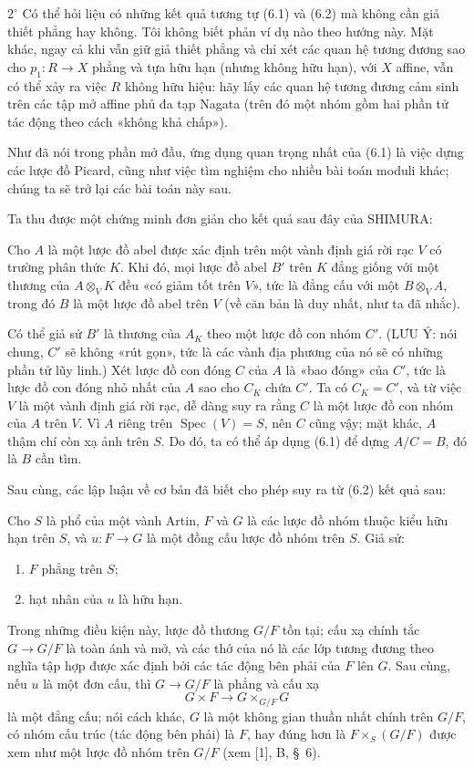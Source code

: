 \smallskip
\noindent $2^\circ$ Có thể hỏi liệu có những kết quả tương tự (6.1) và (6.2)
mà không cần giả thiết phẳng hay không. Tôi không biết phản ví dụ nào theo
hướng này. Mặt khác, ngay cả khi vẫn giữ giả thiết phẳng và chỉ xét các quan
hệ tương đương sao cho $p_1:R\to X$ phẳng và tựa hữu hạn (nhưng không hữu
hạn), với $X$ affine, vẫn có thể xảy ra việc $R$ không hữu hiệu: hãy lấy các
quan hệ tương đương cảm sinh trên các tập mở affine phủ đa tạp Nagata (trên đó
một nhóm gồm hai phần tử tác động theo cách «không khả chấp»).


Như đã nói trong phần mở đầu, ứng dụng quan trọng nhất của (6.1) là việc dựng
các lược đồ Picard, cũng như việc tìm nghiệm cho nhiều bài toán moduli khác;
chúng ta sẽ trở lại các bài toán này sau.

Ta thu được một chứng minh đơn giản cho kết quả sau đây của SHIMURA:

 Cho $A$ là một lược đồ abel được xác định trên một vành
định giá rời rạc $V$ có trường phân thức $K$. Khi đó, mọi lược đồ abel $B'$
trên $K$ đẳng giống với một thương của $A\otimes_V K$ đều «có giảm tốt trên
$V$», tức là đẳng cấu với một $B\otimes_V A$, trong đó $B$ là
một lược đồ abel trên $V$ (về căn bản là duy nhất, như ta đã nhắc).

Có thể giả sử $B'$ là thương của $A_K$ theo một lược đồ con nhóm $C'$.
(LƯU Ý: nói chung, $C'$ sẽ không «rút gọn», tức là các vành địa phương của nó
sẽ có những phần tử lũy linh.) Xét lược đồ con đóng $C$ của $A$ là «bao đóng»
của $C'$, tức là lược đồ con đóng nhỏ nhất của $A$ sao cho $C_K$ chứa $C'$.
Ta có $C_K=C'$, và từ việc $V$ là một vành định giá rời rạc, dễ dàng suy ra
rằng $C$ là một lược đồ con nhóm của $A$ trên $V$. Vì $A$ riêng trên
$\operatorname{Spec}(V)=S$, nên $C$ cũng vậy; mặt khác, $A$ thậm chí còn xạ
ảnh trên $S$. Do đó, ta có thể áp dụng (6.1) để dựng $A/C=B$,
đó là $B$ cần tìm.

Sau cùng, các lập luận về cơ bản đã biết cho phép suy ra từ (6.2) kết quả sau:

 Cho $S$ là phổ của một vành Artin, $F$ và $G$ là các
lược đồ nhóm thuộc kiểu hữu hạn trên $S$, và $u:F\to G$ là một đồng cấu lược
đồ nhóm trên $S$. Giả sử:
\begin{enumerate}
\item[(i)] $F$ phẳng trên $S$;
\item[(ii)] hạt nhân của $u$ là hữu hạn.
\end{enumerate}
Trong những điều kiện này, lược đồ thương $G/F$ tồn tại; cấu xạ chính tắc
$G\to G/F$ là toàn ánh và mở, và các thớ của nó là các lớp tương đương theo
nghĩa tập hợp được xác định bởi các tác động bên phải của $F$ lên $G$. Sau
cùng, nếu $u$ là một đơn cấu, thì $G\to G/F$ là phẳng và cấu xạ
\[
  G\times F\longrightarrow G\times_{G/F}G
\]
là một đẳng cấu; nói cách khác, $G$ là một không gian thuần nhất chính trên
$G/F$, có nhóm cấu trúc (tác động bên phải) là $F$, hay đúng hơn là
$F\times_S(G/F)$ được xem như một lược đồ nhóm trên $G/F$ (xem [1], B,
\S~6).

